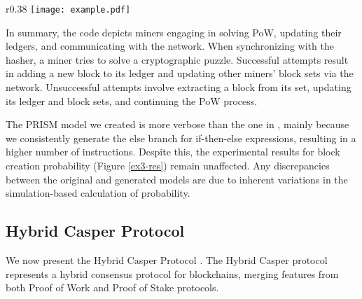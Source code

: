 \begin{wrapfigure}{r}{0.38\textwidth}
   \vspace{-0.75cm}
   \centering
   \texttt{[image: example.pdf]}	
   \vspace{-0.35cm}
   \caption{}
   \label{ex3-res}
   \vspace{-0.75cm}
\end{wrapfigure}
In summary, the code depicts miners engaging in solving PoW, updating their ledgers, and communicating with the network. 
When synchronizing with the hasher, a miner tries to solve a cryptographic puzzle. Successful attempts result in adding a new block to its ledger and updating other miners' block sets via the network. Unsuccessful attempts involve extracting a block from its set, updating its ledger and block sets, and continuing the PoW process.

The PRISM model we created is more verbose than the one in \cite{DBLP:journals/concurrency/BistarelliNGLMV23}, mainly because we consistently generate the else branch for if-then-else expressions, resulting in a higher number of instructions. Despite this, the experimental results for block creation probability (Figure \ref{ex3-res}) remain unaffected. Any discrepancies between the original and generated models are due to inherent variations in the simulation-based calculation of probability.


\subsection{Hybrid Casper Protocol}
\begin{comment}
\begin{wrapfigure}[12]{l}{4.5cm}
	\texttt{[image: ethereum.pdf]}	
\end{wrapfigure} 
\end{comment}
We now present the Hybrid Casper Protocol \cite{DBLP:journals/distribledger/GallettaLMV23}. The Hybrid Casper protocol represents a hybrid consensus protocol for blockchains, merging features from both Proof of Work and Proof of Stake protocols. 

